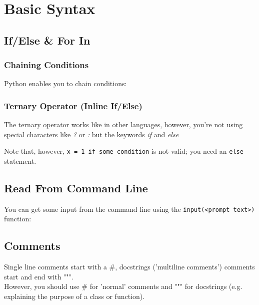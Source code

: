 \section{Basic Syntax}

    \subsection{If/Else \& For In}

        \subsubsection{Chaining Conditions}
            Python enables you to chain conditions:


        \subsubsection{Ternary Operator (Inline If/Else)}
            The ternary operator works like in other languages, however, you're not using special
            characters like \textit{?} or \textit{:} but the keywords \textit{if} and \textit{else}

            Note that, however, \texttt{x = 1 if some_condition} is not valid; you need an
            \texttt{else} statement.

    \subsection{Read From Command Line}
        You can get some input from the command line using the
        \texttt{input(<prompt text>)} function:


    \subsection{Comments}
        Single line comments start with a \#, docstrings ('multiline comments') comments start and
        end with """. \\
        However, you should use \# for 'normal' comments and """ for docstrings (e.g. explaining the
        purpose of a class or function).

